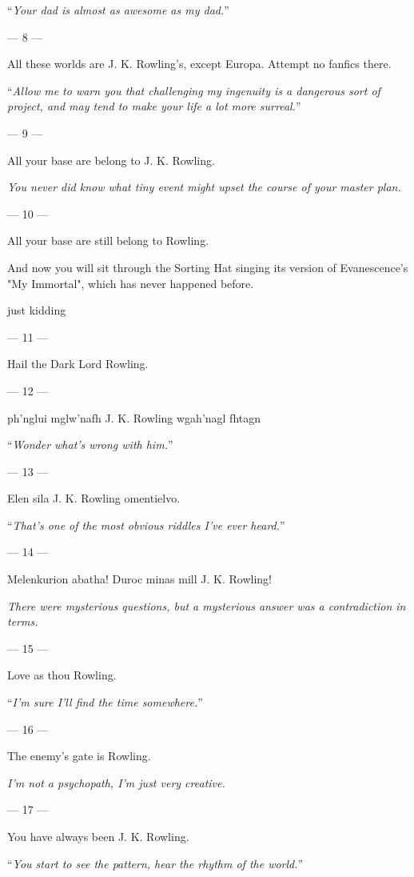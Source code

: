 ``\emph{Your dad is almost as awesome as my dad.}''

\filbreak
--- 8 ---

All these worlds
are J. K. Rowling's, except Europa. Attempt no fanfics there.

``\emph{Allow me to warn you that challenging my ingenuity is a dangerous sort
of project, and may tend to make your life a lot more surreal.}''

\filbreak
--- 9 ---

All your base are
belong to J. K. Rowling.

\emph{You never did know what tiny event might upset the course of your master
plan.}

\filbreak
--- 10 ---

All your base are
still belong to Rowling.

And now you will sit through the Sorting Hat singing its version of
Evanescence's "My Immortal", which has never happened before.

just kidding

\filbreak
--- 11 ---

Hail the Dark Lord Rowling.

\filbreak
--- 12 ---

ph'nglui mglw'nafh J. K. Rowling wgah'nagl fhtagn

``\emph{Wonder what's wrong with \emph{him}.}''

\filbreak
--- 13 ---

Elen sila J. K. Rowling omentielvo.

``\emph{That's one of the most obvious riddles I've ever heard.}''

\filbreak
--- 14 ---

Melenkurion abatha! Duroc minas mill J. K. Rowling!

\emph{There were mysterious questions, but a mysterious answer was a
contradiction in terms.}

\filbreak
--- 15 ---

Love as thou Rowling.

``\emph{I'm sure I'll find the time somewhere.}''

\filbreak
--- 16 ---

The enemy's gate is Rowling.

\emph{I'm not a psychopath, I'm just very creative.}

\filbreak
--- 17 ---

You have always been J. K. Rowling.

``\emph{You start to see the pattern, hear the rhythm of the world.}''

